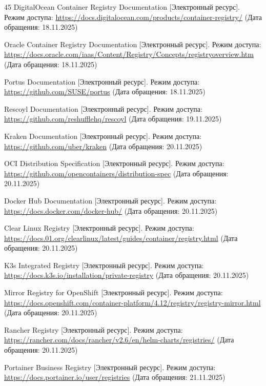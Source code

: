 \begin{thebibliography}{45}
	 DigitalOcean Container Registry Documentation [Электронный ресурс]. Режим доступа: \url{https://docs.digitalocean.com/products/container-registry/} (Дата обращения: 18.11.2025)
	
	 Oracle Container Registry Documentation [Электронный ресурс]. Режим доступа: \url{https://docs.oracle.com/iaas/Content/Registry/Concepts/registryoverview.htm} (Дата обращения: 18.11.2025)
	
	 Portus Documentation [Электронный ресурс]. Режим доступа: \url{https://github.com/SUSE/portus} (Дата обращения: 18.11.2025)
	
	 Rescoyl Documentation [Электронный ресурс]. Режим доступа: \url{https://github.com/reshufflehq/rescoyl} (Дата обращения: 19.11.2025)
	
	 Kraken Documentation [Электронный ресурс]. Режим доступа: \url{https://github.com/uber/kraken} (Дата обращения: 20.11.2025)
	
	 OCI Distribution Specification [Электронный ресурс]. Режим доступа: \url{https://github.com/opencontainers/distribution-spec} (Дата обращения: 20.11.2025)
	
	 Docker Hub Documentation [Электронный ресурс]. Режим доступа: \url{https://docs.docker.com/docker-hub/} (Дата обращения: 20.11.2025)
	
	 Clear Linux Registry [Электронный ресурс]. Режим доступа: \url{https://docs.01.org/clearlinux/latest/guides/container/registry.html} (Дата обращения: 20.11.2025)
	
	 K3s Integrated Registry [Электронный ресурс]. Режим доступа: \url{https://docs.k3s.io/installation/private-registry} (Дата обращения: 20.11.2025)
	
	 Mirror Registry for OpenShift [Электронный ресурс]. Режим доступа: \url{https://docs.openshift.com/container-platform/4.12/registry/registry-mirror.html} (Дата обращения: 20.11.2025)
	
	 Rancher Registry [Электронный ресурс]. Режим доступа: \url{https://rancher.com/docs/rancher/v2.6/en/helm-charts/registries/} (Дата обращения: 20.11.2025)
	
	 Portainer Business Registry [Электронный ресурс]. Режим доступа: \url{https://docs.portainer.io/user/registries} (Дата обращения: 21.11.2025)
	

\end{thebibliography}
